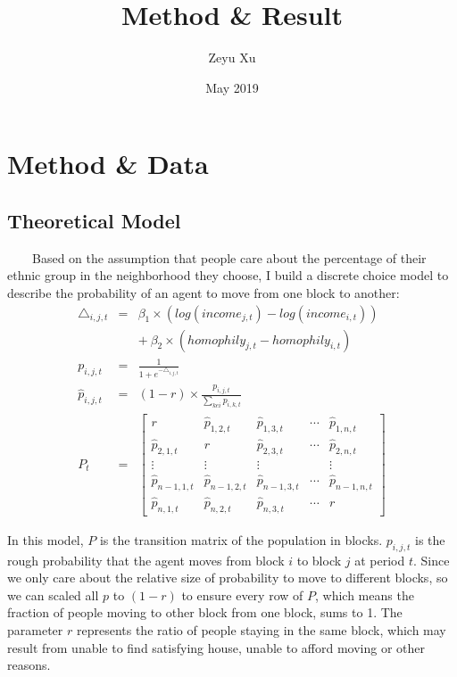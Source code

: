 \documentclass{article}
\title{Method \& Result}
\author{Zeyu Xu}
\date{May 2019}
\begin{document}
\maketitle

\section{Method \& Data}
\subsection{Theoretical Model}
\par \ \ \ \ Based on the assumption that people care about the percentage of their ethnic group in the neighborhood they choose, I build a discrete choice model to describe the probability of an agent to move from one block to another:
\begin{eqnarray}
\triangle_{i,j,t} &=& \beta_1 \times (log(income_{j,t})-log(income_{i,t})) \nonumber\\
&\;&+\ \beta_2 \times (homophily_{j,t}-homophily_{i,t})\\ 
p_{i,j,t} &=& \frac{1}{1+e^{-\triangle_{i,j,t}}}\\
\hat{p}_{i,j,t} &=& (1-r)\times\frac{p_{i,j,t}}{\sum_{ke i} p_{i,k,t}}\\
P_t &=& 
\left[
\begin{array}{ccccc}
r & \hat{p}_{1,2,t} & \hat{p}_{1,3,t} & \cdots & \hat{p}_{1,n,t} \\
\hat{p}_{2,1,t} & r & \hat{p}_{2,3,t} & \cdots & \hat{p}_{2,n,t} \\
\vdots & \vdots & \vdots &  & \vdots \\
\hat{p}_{n-1,1,t} & \hat{p}_{n-1,2,t} & \hat{p}_{n-1,3,t} & \cdots & \hat{p}_{n-1,n,t}\\
\hat{p}_{n,1,t} & \hat{p}_{n,2,t} & \hat{p}_{n,3,t} & \cdots & r 
\end{array}
\right]
\end{eqnarray}
\par In this model, $P$ is the transition matrix of the population in blocks. $p_{i,j,t}$ is the rough probability that the agent moves from block $i$ to block $j$ at period $t$. Since we only care about the relative size of probability to move to different blocks, so we can scaled all $p$ to $(1-r)$ to ensure every row of $P$, which means the fraction of people moving to other block from one block, sums to 1. The parameter $r$ represents the ratio of people staying in the same block, which may result from unable to find satisfying house, unable to afford moving or other reasons. 
\end{document}
